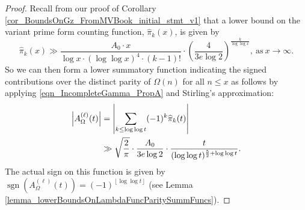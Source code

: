 \documentclass[11pt,reqno,a4letter]{article}
\numberwithin{figure}{section}
\numberwithin{table}{section}
\newcommand{\floor}[1]{\left\lfloor #1 \right\rfloor}
\theoremstyle{plain}
\numberwithin{theorem}{section}
\theoremstyle{definition}
\newcommand{\SuccSim}[0]{\overset{_{\scriptsize{\blacktriangle}}}{\succsim}}
\renewcommand{\SuccSim}[0]{\ensuremath{\gg}}
\begin{document}
\begin{proof} 
Recall from our proof of Corollary \ref{cor_BoundsOnGz_FromMVBook_initial_stmt_v1} that 
a lower bound on the variant prime form counting function, $\widehat{\pi}_k(x)$, is given by 
\[
\widehat{\pi}_k(x) \SuccSim \frac{A_0 \cdot x}{\log x \cdot (\log\log x)^4 \cdot (k-1)!} \cdot 
     \left(\frac{4}{3e\log 2}\right)^{\frac{k}{\log\log x}}, \mathrm{\ as\ } x \rightarrow \infty. 
\]
So we can then form a lower summatory function indicating the signed contributions over the distinct 
parity of $\Omega(n)$ for all $n \leq x$ as follows by applying 
\eqref{eqn_IncompleteGamma_PropA} and Stirling's approximation: 
\begin{align} 
\label{proof_thm_GInvFunc_v0} 
\left\lvert A_{\Omega}^{(\ell)}(t) \right\rvert & = 
     \left\lvert \sum_{k \leq \log\log t} (-1)^k \widehat{\pi}_k(t) \right\rvert \\ 
\notag
     & \SuccSim  
     \sqrt{\frac{2}{\pi}} \cdot \frac{A_0}{3e \log 2} \cdot 
     \frac{t}{(\log\log t)^{\frac{5}{2} + \log\log t}}. 
\end{align} 
The actual sign on this function is given by 
$\operatorname{sgn}(A_{\Omega}^{(\ell)}(t)) = (-1)^{\floor{\log\log t}}$ 
(see Lemma \ref{lemma_lowerBoundsOnLambdaFuncParitySummFuncs}). 


\end{proof}
\end{document}
